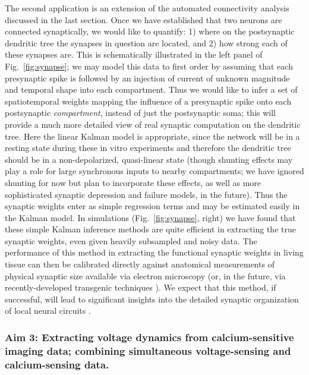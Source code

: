 \documentclass[12pt]{article}
\begin{document}
The second application is an extension of the automated connectivity
analysis discussed in the last section.  Once we have established that
two neurons are connected synaptically, we would like to quantify: 1)
where on the postsynaptic dendritic tree the synapses in question are
located, and 2) how strong each of these synapses are.  This is
schematically illustrated in the left panel of Fig.~\ref{fig:synapse};
we may model this data to first order by assuming that each
presynaptic spike is followed by an injection of current of unknown
magnitude and temporal shape into each compartment.  Thus we would
like to infer a set of spatiotemporal weights mapping the influence of
a presynaptic spike onto each postsynaptic \emph{compartment}, instead
of just the postsynaptic soma; this will provide a much more detailed
view of real synaptic computation on the dendritic tree.  Here the
linear Kalman model is appropriate, since the network will be in a
resting state during these in vitro experiments and therefore the
dendritic tree should be in a non-depolarized, quasi-linear state
(though shunting effects may play a role for large synchronous inputs
to nearby compartments; we have ignored shunting for now but plan to
incorporate these effects, as well as more sophisticated synaptic
depression and failure models, in the future).  Thus the synaptic
weights enter as simple regression terms and may be estimated easily
in the Kalman model.  In simulations (Fig.~\ref{fig:synapse}, right)
we have found that these simple Kalman inference methods are quite
efficient in extracting the true synaptic weights, even given heavily
subsampled and noisy data.  The performance of this method in
extracting the functional synaptic weights in living tissue can then
be calibrated directly against anatomical measurements of physical
synaptic size available via electron microscopy (or, in the future,
via recently-developed transgenic techniques \cite{Brainbow07}).  We
expect that this method, if successful, will lead to significant
insights into the detailed synaptic organization of local neural
circuits \cite{Song05}.




\subsubsection*{Aim 3: Extracting voltage dynamics from
  calcium-sensitive imaging data; combining simultaneous
  voltage-sensing and calcium-sensing data.}
\end{document}
